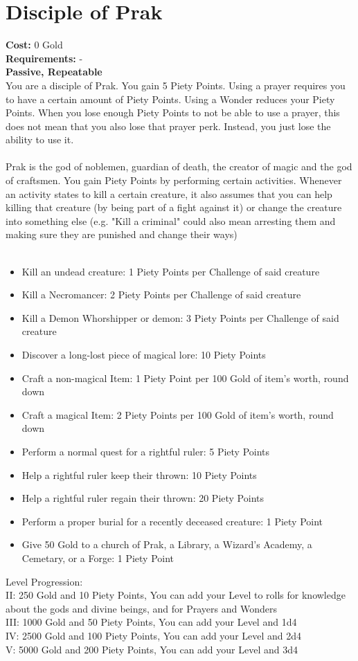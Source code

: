 \section*{Disciple of Prak}
\textbf{Cost:} 0 Gold\\
\textbf{Requirements:} - \\
\textbf{Passive, Repeatable}\\
You are a disciple of Prak. You gain 5 Piety Points. Using a prayer requires you to have a certain amount of Piety Points. Using a Wonder reduces your Piety Points. When you lose enough Piety Points to not be able to use a prayer, this does not mean that you also lose that prayer perk. Instead, you just lose the ability to use it.\\
\\
Prak is the god of noblemen, guardian of death, the creator of magic and the god of craftsmen. You gain Piety Points by performing certain activities. Whenever an activity states to kill a certain creature, it also assumes that you can help killing that creature (by being part of a fight against it) or change the creature into something else (e.g. "Kill a criminal" could also mean arresting them and making sure they are punished and change their ways)\\
\\
\begin{itemize}
	\item Kill an undead creature: 1 Piety Points per Challenge of said creature
	\item Kill a Necromancer: 2 Piety Points per Challenge of said creature
	\item Kill a Demon Whorshipper or demon: 3 Piety Points per Challenge of said creature
	\item Discover a long-lost piece of magical lore: 10 Piety Points
	\item Craft a non-magical Item: 1 Piety Point per 100 Gold of item's worth, round down
	\item Craft a magical Item: 2 Piety Points per 100 Gold of item's worth, round down
	\item Perform a normal quest for a rightful ruler: 5 Piety Points
	\item Help a rightful ruler keep their thrown: 10 Piety Points
	\item Help a rightful ruler regain their thrown: 20 Piety Points
	\item Perform a proper burial for a recently deceased creature: 1 Piety Point
	\item Give 50 Gold to a church of Prak, a Library, a Wizard's Academy, a Cemetary, or a Forge: 1 Piety Point
\end{itemize}

Level Progression:\\
II: 250 Gold and 10 Piety Points, You can add your Level to rolls for knowledge about the gods and divine beings, and for Prayers and Wonders\\
III: 1000 Gold and 50 Piety Points, You can add your Level and 1d4\\
IV: 2500 Gold and 100 Piety Points, You can add your Level and 2d4\\
V: 5000 Gold and 200 Piety Points, You can add your Level and 3d4\\